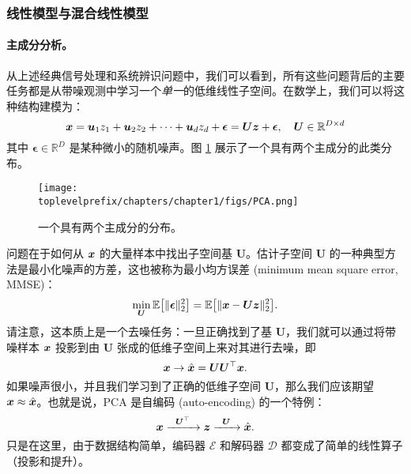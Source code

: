 \documentclass[../../book-main_zh.tex]{subfiles}
\begin{document}

\subsubsection{线性模型与混合线性模型}
\label{sec:PCA-ICA}
\paragraph{主成分分析。}
从上述经典信号处理和系统辨识问题中，我们可以看到，所有这些问题背后的主要任务都是从带噪观测中学习一个{\em 单一}的低维线性子空间。在数学上，我们可以将这种结构建模为：
\begin{equation}
    \bm{x} = \boldsymbol{u}_1 z_1 + \boldsymbol{u}_2 z_2 + \cdots + \boldsymbol{u}_d z_d + \boldsymbol{\epsilon} =  \boldsymbol{U} \bm{z} + \boldsymbol{\epsilon}, \quad \boldsymbol{U} \in \mathbb{R}^{D\times d}
    \label{eqn:PCA-model}
\end{equation}
其中 $\boldsymbol{\epsilon} \in \mathbb{R}^D$ 是某种微小的随机噪声。图 \ref{fig:PCA} 展示了一个具有两个主成分的此类分布。
\begin{figure}
    \centering
    \texttt{[image: \\toplevelprefix/chapters/chapter1/figs/PCA.png]}
    \caption{一个具有两个主成分的分布。}
    \label{fig:PCA}
\end{figure}
问题在于如何从 $\bm{x}$ 的大量样本中找出子空间基 $\boldsymbol{U}$。估计子空间 $\boldsymbol{U}$ 的一种典型方法是最小化噪声的方差，这也被称为最小均方误差 (minimum mean square error, MMSE)：
\begin{equation}
    \min_{\boldsymbol{U}} \mathbb{E}\big[\|\boldsymbol{\epsilon}\|_2^2\big] = \mathbb{E}\big[\|\bm{x} - \boldsymbol{U} \bm{z}\|_2^2\big].
\end{equation}
请注意，这本质上是一个去噪任务：一旦正确找到了基 $\boldsymbol{U}$，我们就可以通过将带噪样本 $\bm{x}$ 投影到由 $\boldsymbol{U}$ 张成的低维子空间上来对其进行去噪，即
\begin{equation}
\bm{x} \rightarrow \hat {\bm{x}} = \boldsymbol{U}\boldsymbol{U}^\top \bm{x}. 
\end{equation}
如果噪声很小，并且我们学习到了正确的低维子空间 $\boldsymbol{U}$，那么我们应该期望 $\bm{x} \approx \hat {\bm{x}}$。也就是说，PCA 是自编码 (auto-encoding) 的一个特例：
\begin{equation}
    \bm{x}   \xrightarrow{\hspace{2mm} \boldsymbol{U}^\top\hspace{2mm}} \bm{z}  \xrightarrow{\hspace{2mm} \boldsymbol{U} \hspace{2mm}} \hat {\bm{x}}.
       \label{eqn:auto-encoding-PCA}
\end{equation}
只是在这里，由于数据结构简单，编码器 $\mathcal{E}$ 和解码器 $\mathcal{D}$ 都变成了简单的线性算子（投影和提升）。
\end{document}
